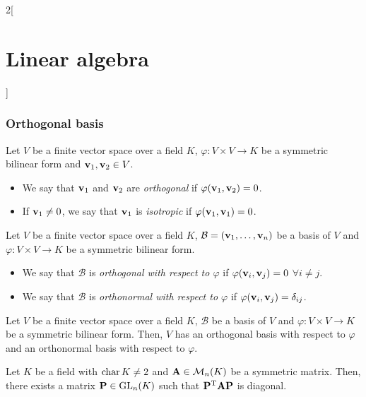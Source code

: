 \documentclass[../../../main.tex]{subfiles}
\begin{document}
\begin{multicols}{2}[\section{Linear algebra}]
  \subsubsection{Orthogonal basis}
  \begin{definition}\label{LA_isotrop}
    Let $V$ be a finite vector space over a field $K$, $\varphi:V\times V\rightarrow K$ be a symmetric bilinear form and $\boldsymbol{\mathrm{v}}_1,\boldsymbol{\mathrm{v}}_2\in V$.
    \begin{itemize}
      \item We say that $\boldsymbol{\mathrm{v}}_1$ and $\boldsymbol{\mathrm{v}}_2$ are \textit{orthogonal} if $\varphi(\boldsymbol{\mathrm{v}}_1,\boldsymbol{\mathrm{v}}_2)=0$.
      \item If $\boldsymbol{\mathrm{v}}_1\ne 0$, we say that $\boldsymbol{\mathrm{v}}_1$ is \textit{isotropic} if $\varphi(\boldsymbol{\mathrm{v}}_1,\boldsymbol{\mathrm{v}}_1)=0$.
    \end{itemize}
  \end{definition}
  \begin{definition}
    Let $V$ be a finite vector space over a field $K$, $\mathcal{B}=(\boldsymbol{\mathrm{v}}_1,\ldots,\boldsymbol{\mathrm{v}}_n)$ be a basis of $V$ and $\varphi:V\times V\rightarrow K$ be a symmetric bilinear form.
    \begin{itemize}
      \item We say that $\mathcal{B}$ is \textit{orthogonal with respect to $\varphi$} if $\varphi(\boldsymbol{\mathrm{v}}_i,\boldsymbol{\mathrm{v}}_j)=0$ $\forall i\ne j$.
      \item We say that $\mathcal{B}$ is \textit{orthonormal with respect to $\varphi$} if $\varphi(\boldsymbol{\mathrm{v}}_i,\boldsymbol{\mathrm{v}}_j)=\delta_{ij}$.
    \end{itemize}
  \end{definition}
  \begin{theorem}
    Let $V$ be a finite vector space over a field $K$, $\mathcal{B}$ be a basis of $V$ and $\varphi:V\times V\rightarrow K$ be a symmetric bilinear form. Then, $V$ has an orthogonal basis with respect to $\varphi$ and an orthonormal basis with respect to $\varphi$.
  \end{theorem}
  \begin{corollary}
    Let $K$ be a field with $\operatorname{char} K\ne 2$ and $\boldsymbol{\mathrm{A}}\in\mathcal{M}_n(K)$ be a symmetric matrix. Then, there exists a matrix $\boldsymbol{\mathrm{P}}\in\mathrm{GL}_n(K)$ such that $\vb{P}^{\mathrm{T}}\boldsymbol{\mathrm{A}}\boldsymbol{\mathrm{P}}$ is diagonal.
  \end{corollary}

\end{multicols}
\end{document}
